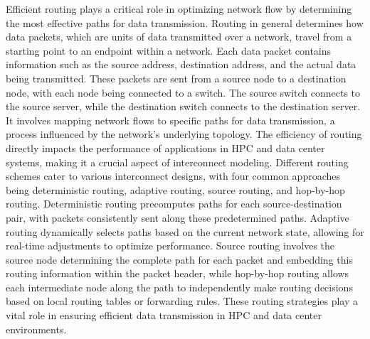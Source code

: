 Efficient routing plays a critical role in optimizing network flow by determining the most effective paths for data transmission. Routing in general determines how data packets, which are units of data transmitted over a network, travel from a starting point to an endpoint within a network. Each data packet contains information such as the source address, destination address, and the actual data being transmitted. These packets are sent from a source node to a destination node, with each node being connected to a switch. The source switch connects to the source server, while the destination switch connects to the destination server. It involves mapping network flows to specific paths for data transmission, a process influenced by the network's underlying topology. The efficiency of routing directly impacts the performance of applications in HPC and data center systems, making it a crucial aspect of interconnect modeling. Different routing schemes cater to various interconnect designs, with four common approaches being deterministic routing, adaptive routing, source routing, and hop-by-hop routing. Deterministic routing precomputes paths for each source-destination pair, with packets consistently sent along these predetermined paths. Adaptive routing dynamically selects paths based on the current network state, allowing for real-time adjustments to optimize performance. Source routing involves the source node determining the complete path for each packet and embedding this routing information within the packet header, while hop-by-hop routing allows each intermediate node along the path to independently make routing decisions based on local routing tables or forwarding rules. These routing strategies play a vital role in ensuring efficient data transmission in HPC and data center environments.

